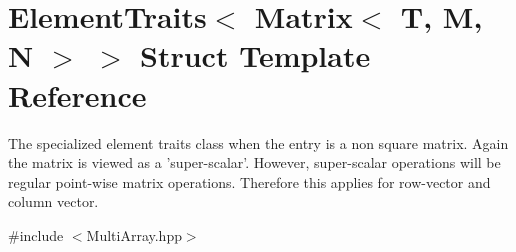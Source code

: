 \hypertarget{struct_d_o_1_1_element_traits_3_01_matrix_3_01_t_00_01_m_00_01_n_01_4_01_4}{\section{Element\-Traits$<$ Matrix$<$ T, M, N $>$ $>$ Struct Template Reference}
\label{struct_d_o_1_1_element_traits_3_01_matrix_3_01_t_00_01_m_00_01_n_01_4_01_4}
}


The specialized element traits class when the entry is a non square matrix. Again the matrix is viewed as a 'super-\/scalar'. However, super-\/scalar operations will be regular point-\/wise matrix operations. Therefore this applies for row-\/vector and column vector.  




{\ttfamily \#include $<$Multi\-Array.\-hpp$>$}

